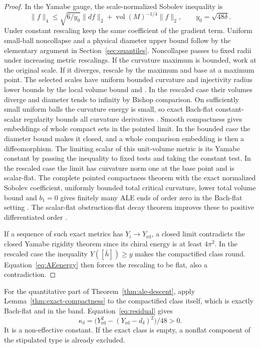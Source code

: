 \documentclass[11pt]{article}
\numberwithin{equation}{section}
\theoremstyle{definition}
\theoremstyle{remark}
\newcommand{\vol}{\operatorname{vol}}
\newcommand{\Yrd}{Y_{\mathrm{rd}}}
\begin{document}
\begin{proof}
In the Yamabe gauge, the scale-normalized Sobolev inequality is
\[
 \|f\|_4\le \sqrt{6/y_0}\|df\|_2+
                 \vol(M)^{-1/4}\|f\|_2,\qquad y_0=\sqrt{48\delta}.
\]
Under constant rescaling keep the same coefficient of the
gradient term. Uniform small-ball noncollapse and a physical
diameter upper bound follow by the elementary argument in
Section~\ref{sec:quantiles}. Noncollapse passes to fixed radii
under increasing metric rescalings. If the curvature
maximum is bounded, work at the original scale. If it
diverges, rescale by the maximum and base at a maximum
point. The selected scales have uniform bounded curvature
and injectivity radius lower bounds by the local volume
bound and \cite[Theorem 4.7]{CheegerGromovTaylor1982}. In the
rescaled case their volumes diverge and diameter tends to
infinity by Bishop comparison. On sufficiently small
uniform balls the curvature energy is small, so exact
Bach-flat constant-scalar regularity bounds all curvature
derivatives \cite[Theorem 4.1 and the remark after Theorem 1.3]{TianViaclovsky2004Moduli}.
Smooth compactness gives embeddings of whole compact sets
in the pointed limit. In the bounded case the diameter
bound makes it closed, and a whole comparison embedding is then
a diffeomorphism. The limiting scalar of this unit-volume
metric is its Yamabe constant by passing the inequality to
fixed tests and taking the constant test. In the rescaled
case the limit has curvature norm one at the base point and
is scalar-flat. The complete pointed compactness theorem with
the exact normalized Sobolev coefficient, uniformly bounded
total critical curvature, lower total volume bound and
\(b_1=0\) gives finitely many ALE ends of order zero in the
Bach-flat setting \cite[Theorem 1.1, following remark and \S7]{TianViaclovsky2004Moduli}.
The scalar-flat obstruction-flat decay theorem improves these
to positive differentiated order
\cite[Definition 1.1 and Theorem 1.2]{AcheViaclovsky2011Obstruction}.

If a sequence of such exact metrics has \(Y_i\to\Yrd\),
a closed limit contradicts the closed Yamabe rigidity theorem
since its chiral energy is at least \(4\pi^2\). In the
rescaled case the inequality \(Y([\bar h])\ge y\) makes the
compactified class round. Equation~\eqref{eq:AEenergy} then
forces the rescaling to be flat, also a contradiction.
\end{proof}

For the quantitative part of Theorem~\ref{thm:ale-descent},
apply Lemma~\ref{thm:exact-compactness} to the compactified
class itself, which is exactly Bach-flat and in the band.
Equation~\eqref{eq:residual} gives
\[
 \kappa_\delta=\big(\Yrd^2-(\Yrd-d_\delta)^2\big)/48>0 .
\]
It is a non-effective constant. If the exact class is empty,
a nonflat component of the stipulated type is already excluded.
\end{document}
